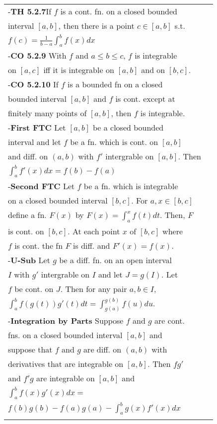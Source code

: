 \documentclass[10 pt,landscape]{article}
\begin{document}
\begin{multicols}{4}
\begin{tabular}{@{}ll@{}}
-\textbf{TH 5.2.7}If $f$ is a cont. fn. on a closed bounded\\ interval $[a,b]$, then there is a point $c \in [a,b]$ s.t. \\ $f(c)=\frac{1}{b-a} \int_{a}^{b} f(x)dx$\\
-\textbf{CO 5.2.9} With $f$ and $a \leq b \leq c$, $f$ is integrable\\ on $[a,c]$ iff it is integrable on $[a,b]$ and on $[b,c]$.\\
-\textbf{CO 5.2.10} If $f$ is a bounded fn on a closed\\bounded interval $[a,b]$ and $f$ is cont. except at \\finitely many points of $[a,b]$, then $f$ is integrable.\\
-\textbf{First FTC} Let $[a,b]$ be a closed bounded \\interval and let $f$ be a fn. which is cont. on $[a,b]$ \\ and diff. on $(a,b)$ with $f'$ intergrable on $[a,b]$. Then \\ $\int_{a}^{b}f'(x)dx=f(b)-f(a)$\\
-\textbf{Second FTC} Let $f$ be a fn. which is integrable\\ on a closed bounded interval $[b,c]$. For $a,x \in [b,c]$\\ define a fn. $F(x)$ by $F(x)=\int_{a}^{x}f(t)dt$. Then,  $F$ \\is cont. on $[b,c]$. At each point $x$ of $[b,c]$ where\\ $f$ is cont. the fn $F$ is diff. and $F'(x)=f(x)$.\\
-\textbf{U-Sub} Let $g$ be a diff. fn. on an open interval \\$I$ with $g'$ intergrable on $I$ and let $J=g(I)$. Let \\$f$ be cont. on $J$. Then for any pair $a,b \in I$, \\ $\int_{a}^{b}f(g(t))g'(t)dt=\int_{g(a)}^{g(b)}f(u)du$.\\
-\textbf{Integration by Parts} Suppose $f$ and $g$ are cont. \\fns. on a closed bounded interval $[a,b]$ and \\suppose that $f$ and $g$ are diff. on $(a,b)$ with\\ derivatives that are integrable on $[a,b]$. Then $fg'$ \\and $f'g$ are integrable on $[a,b]$ and \\ $\int_{a}^{b}f(x) g'(x)dx=$\\$f(b)g(b)-f(a)g(a)-\int_{a}^{b}g(x)f'(x)dx$\\
\\




\end{tabular}
\end{multicols}
\end{document}
